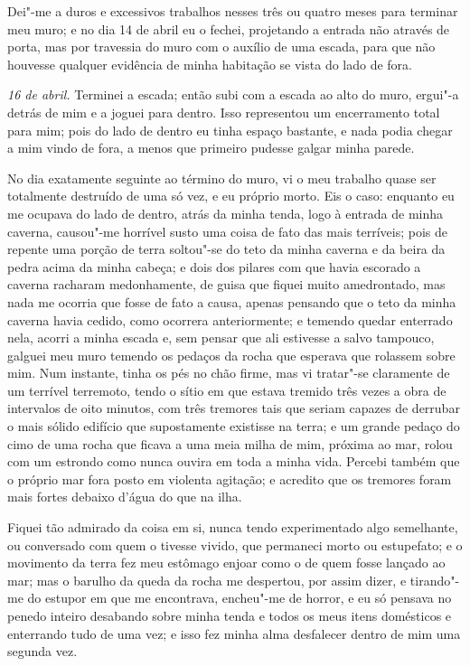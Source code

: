 Dei"-me a duros e excessivos trabalhos nesses três ou quatro meses para
terminar meu muro; e no dia 14 de abril eu o fechei, projetando a
entrada não através de porta, mas por travessia do muro com o auxílio de
uma escada, para que não houvesse qualquer evidência de minha habitação
se vista do lado de fora.

\emph{16 de abril.} Terminei a escada; então subi com a escada ao alto
do muro, ergui"-a detrás de mim e a joguei para dentro. Isso representou
um encerramento total para mim; pois do lado de dentro eu tinha espaço
bastante, e nada podia chegar a mim vindo de fora, a menos que primeiro
pudesse galgar minha parede.

No dia exatamente seguinte ao término do muro, vi o meu trabalho quase
ser totalmente destruído de uma só vez, e eu próprio morto. Eis o caso:
enquanto eu me ocupava do lado de dentro, atrás da minha tenda, logo à
entrada de minha caverna, causou"-me horrível susto uma coisa de fato das
mais terríveis; pois de repente uma porção de terra soltou"-se do teto da
minha caverna e da beira da pedra acima da minha cabeça; e dois dos
pilares com que havia escorado a caverna racharam medonhamente, de guisa
que fiquei muito amedrontado, mas nada me ocorria que fosse de fato a
causa, apenas pensando que o teto da minha caverna havia cedido, como
ocorrera anteriormente; e temendo quedar enterrado nela, acorri a minha
escada e, sem pensar que ali estivesse a salvo tampouco, galguei meu
muro temendo os pedaços da rocha que esperava que rolassem sobre mim.
Num instante, tinha os pés no chão firme, mas vi tratar"-se claramente de
um terrível terremoto, tendo o sítio em que estava tremido três vezes a
obra de intervalos de oito minutos, com três tremores tais que seriam
capazes de derrubar o mais sólido edifício que supostamente existisse na
terra; e um grande pedaço do cimo de uma rocha que ficava a uma meia
milha de mim, próxima ao mar, rolou com um estrondo como nunca ouvira em
toda a minha vida. Percebi também que o próprio mar fora posto em
violenta agitação; e acredito que os tremores foram mais fortes debaixo
d'água do que na ilha.

Fiquei tão admirado da coisa em si, nunca tendo experimentado algo
semelhante, ou conversado com quem o tivesse vivido, que permaneci morto
ou estupefato; e o movimento da terra fez meu estômago enjoar como o de
quem fosse lançado ao mar; mas o barulho da queda da rocha me despertou,
por assim dizer, e tirando"-me do estupor em que me encontrava, encheu"-me
de horror, e eu só pensava no penedo inteiro desabando sobre minha tenda
e todos os meus itens domésticos e enterrando tudo de uma vez; e isso
fez minha alma desfalecer dentro de mim uma segunda vez.

